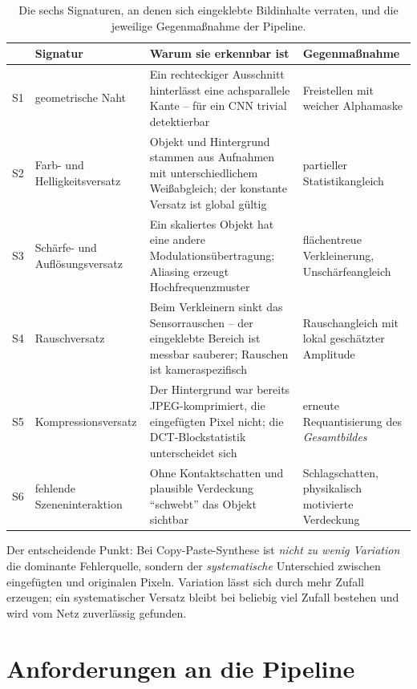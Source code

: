 \begin{table}[htbp]
\centering
\caption[Signaturen eingeklebter Objekte]{Die sechs Signaturen, an denen sich
eingeklebte Bildinhalte verraten, und die jeweilige Gegenmaßnahme der Pipeline.}
\label{tab:signaturen}
\footnotesize
\begin{tabularx}{\textwidth}{@{}L{0.035\textwidth}L{0.24\textwidth}XL{0.235\textwidth}@{}}
\toprule
 & \textbf{Signatur} & \textbf{Warum sie erkennbar ist} &
\textbf{Gegenmaßnahme} \\
\midrule
S1 & geometrische Naht &
Ein rechteckiger Ausschnitt hinterlässt eine achsparallele Kante -- für ein CNN
trivial detektierbar &
Freistellen mit weicher Alphamaske \\
S2 & Farb- und Helligkeitsversatz &
Objekt und Hintergrund stammen aus Aufnahmen mit unterschiedlichem
Weißabgleich; der konstante Versatz ist global gültig &
partieller Statistikangleich \parencite{reinhard2001,tsai2017} \\
S3 & Schärfe- und Auflösungsversatz &
Ein skaliertes Objekt hat eine andere Modulationsübertragung; Aliasing erzeugt
Hochfrequenzmuster \parencite{popescu2005,zhangr2019} &
flächentreue Verkleinerung, Unschärfeangleich \\
S4 & Rauschversatz &
Beim Verkleinern sinkt das Sensorrauschen -- der eingeklebte Bereich ist
messbar sauberer; Rauschen ist kameraspezifisch \parencite{lukas2006} &
Rauschangleich mit lokal geschätzter Amplitude \parencite{immerkaer1996} \\
S5 & Kompressionsversatz &
Der Hintergrund war bereits JPEG-komprimiert, die eingefügten Pixel nicht; die
DCT-Blockstatistik unterscheidet sich \parencite{wallace1992jpeg} &
erneute Requantisierung des \emph{Gesamtbildes} \\
S6 & fehlende Szeneninteraktion &
Ohne Kontaktschatten und plausible Verdeckung \enquote{schwebt} das Objekt
sichtbar &
Schlagschatten, physikalisch motivierte Verdeckung \\
\bottomrule
\end{tabularx}
\end{table}

Der entscheidende Punkt: Bei Copy-Paste-Synthese ist \emph{nicht zu wenig
Variation} die dominante Fehlerquelle, sondern der \emph{systematische}
Unterschied zwischen eingefügten und originalen Pixeln. Variation lässt sich
durch mehr Zufall erzeugen; ein systematischer Versatz bleibt bei beliebig viel
Zufall bestehen und wird vom Netz zuverlässig gefunden.

\section{Anforderungen an die Pipeline}
\label{sec:anforderungen}

